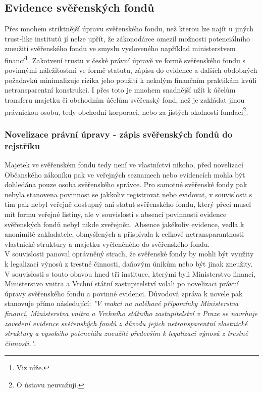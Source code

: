 \documentclass{article}
\begin{document}
\subsection{Evidence svěřenských fondů}

Přes mnohem striktnější úpravu svěřenského fondu, než kterou lze najít u jiných trust-like institutů jí nelze upřít, že zákonodárce omezil možnosti potenciálního zneužití svěřenského fondu ve smyslu vysloveného například ministerstvem financí\footnote{Viz níže.}. Zakotvení trustu v české právní úpravě ve formě svěřenského fondu s povinnými náležitostmi ve formě statutu, zápisu do evidence a dalších obdobných požadavků minimalizuje rizika jeho použití k nekalým finančním praktikám kvůli netransparentní konstrukci. I přes toto je mnohem snadnější užít k účelům transferu majetku či obchodním účelům svěřenský fond, než je zakládat jinou právnickou osobu, tedy obchodní korporaci, nebo za jistých okolností fundaci\footnote{O ústavu neuvažuji.}.\\

\subsubsection{Novelizace právní úpravy - zápis svěřenských fondů do rejstříku}

Majetek ve svěřenském fondu tedy není ve vlastníctví nikoho, před novelizací Občanského zákoníku pak ve veřejných seznamech nebo evidencích mohla být dohledána pouze osoba svěřenského správce. Pro samotné svěřenské fondy pak nebyla stanovena povinnost se jakkoliv registrovat nebo evidovat, v souvislosti s tím pak nebyl veřejně dostupný ani statut svěřenského fondu, který přeci musel mít formu veřejné listiny, ale v souvislosti s absencí povinnosti evidence svěřenských fondů nebyl nikde zveřejněn. Absence jakékoliv evidence, vedla k anonimitě zakladatele, obmyšlených a přispívala k celkové netransparantnosti vlastnické struktury a majetku vyčleněného do svěřenského fondu.\\

V souvislosti panoval oprávněný strach, že svěřenské fondy by mohli být využity k legalizaci výnosů z trestné činnosti, daňovým únikům nebo být jinak zneužity. V souvislosti s touto obavou hned tři instituce, kterými byli Ministerstvo financí, Ministerstvo vnitra a Vrchní státní zastupitelství volali po novelizaci právní úpravy svěřenského fondu a povinné evidenci. Důvodová zpráva k novele pak stanovuje přímo následující: \textit{"V reakci na naléhavé připomínky Ministerstva financí, Ministerstva vnitra a Vrchního státního zastupitelství v Praze se navrhuje zavedení evidence svěřenských fondů z důvodu jejich netransparentní vlastnické struktury a vysokého potenciálu zneužití především k legalizaci výnosů z trestné činnosti."}.\\
\end{document}
